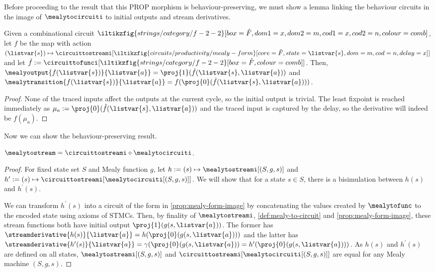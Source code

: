 Before proceeding to the result that this PROP morphism is behaviour-preserving,
we must show a lemma linking the behaviour circuits in the image of
\(\mealytocircuiti\) to initial outputs and stream derivatives.

\begin{proposition}
    \label{prop:mealy-form-image}
    Given a combinational circuit \(
    \iltikzfig{strings/category/f-2-2}[box=\hat{F},dom1=x,dom2=m,cod1=x,cod2=n,colour=comb]
    \), let \(f\) be the map with action \(
    (\listvar{s}) \mapsto
    \circuittostreami[
        \iltikzfig{circuits/productivity/mealy-form}[core=\hat{F},state=\listvar{s},dom=m,cod=n,delay=x]
    ]
    \) and let \(
    \hat{f}
    :=
    \circuittofunci[
        \iltikzfig{strings/category/f-2-2}[box=\hat{F},colour=comb]
    ]
    \).
    Then, \(
    \mealyoutput{f(\listvar{s})}{\listvar{a}}
    =
    \proj{1}(\hat{f}(\listvar{s}, \listvar{a}))
    \) and \(
    \mealytransition{f(\listvar{s})}{\listvar{a}}
    =
    f(\proj{0}(\hat{f}(\listvar{s}, \listvar{a})))
    \).
\end{proposition}
\begin{proof}
    None of the traced inputs affect the outputs at the
    current cycle, so the initial output is trivial.
    The least fixpoint is reached immediately as \(
    \mu_a := \proj{0}(\hat{f}(\listvar{s}, \listvar{a}))
    \) and the traced input is captured by the delay, so the derivative
    will indeed be \(f(\mu_a)\).
\end{proof}

Now we can show the behaviour-preserving result.

\begin{theorem}\label{thm:mealy-to-circuit}
    \(
    \mealytostream = \circuittostreami \circ \mealytocircuiti
    \).
\end{theorem}
\begin{proof}
    For fixed state set \(S\) and Mealy function \(g\), let
    \(h := (s) \mapsto \mealytostreami[(S, g, s)]\) and \(
    h^\prime := (s) \mapsto \circuittostreami[\mealytocircuiti[(S, g, s)]]
    \).
    We will show that for a state \(s \in S\), there is a bisimulation
    between \(h(s)\) and \(h^\prime(s)\).

    We can transform \(h^\prime(s)\) into a circuit of the form in
    \cref{prop:mealy-form-image} by concatenating the values created by
    \(\mealytofunc\) to the encoded state using axioms of STMCs.
    Then, by finality of \(\mealytostreami\), \cref{def:mealy-to-circuit} and
    \cref{prop:mealy-form-image}, these stream functions both have initial output \(
    \proj{1}(g(s, \listvar{a}))
    \).
    The former has \(
    \streamderivative{h(s)}{\listvar{a}} = h(\proj{0}(g(s, \listvar{a})))
    \) and the latter has \(
    \streamderivative{h^\prime(s)}{\listvar{a}} =
    \gamma(\proj{0}(g(s, \listvar{a})) =
    h^\prime(\proj{0}(g(s, \listvar{a})))
    \).
    As \(h(s)\) and \(h^\prime(s)\) are defined on all states,
    \(\mealytostreami[(S, g, s)]\) and
    \(\circuittostreami[\mealytocircuiti[(S, g, s)]]\) are equal for any Mealy
    machine \((S, g, s)\).
\end{proof}

